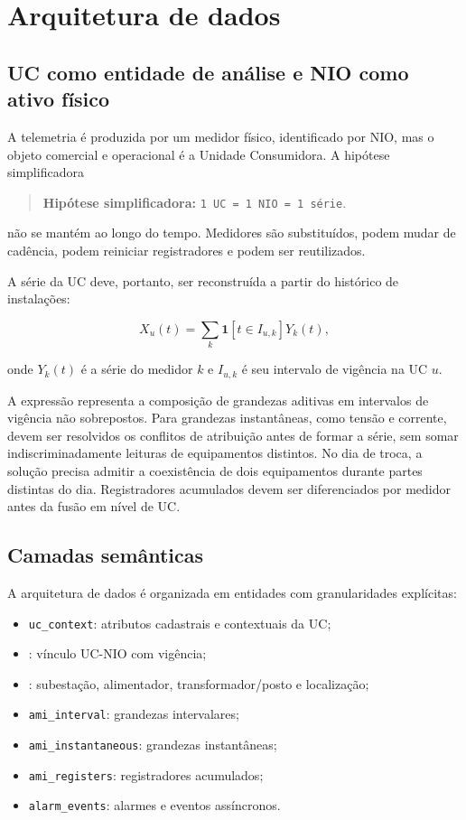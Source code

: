 \chapter{Arquitetura de dados}\label{arquitetura-de-dados}

\section{UC como entidade de análise e NIO como ativo físico}\label{uc-como-entidade-de-anuxe1lise-e-nio-como-ativo-fuxedsico}

A telemetria é produzida por um medidor físico, identificado por NIO, mas o objeto comercial e operacional é a Unidade Consumidora. A hipótese simplificadora

\begin{quote}
\textbf{Hipótese simplificadora:} \texttt{1~UC~=~1~NIO~=~1~série}.
\end{quote}

não se mantém ao longo do tempo. Medidores são substituídos, podem mudar de cadência, podem reiniciar registradores e podem ser reutilizados.

A série da UC deve, portanto, ser reconstruída a partir do histórico de instalações:

\[X_u(t)=\sum_k \mathbf{1}[t\in I_{u,k}]Y_k(t),\]

onde \(Y_k(t)\) é a série do medidor \(k\) e \(I_{u,k}\) é seu intervalo de vigência na UC \(u\).

A expressão representa a composição de grandezas aditivas em intervalos de vigência não sobrepostos. Para grandezas instantâneas, como tensão e corrente, devem ser resolvidos os conflitos de atribuição antes de formar a série, sem somar indiscriminadamente leituras de equipamentos distintos. No dia de troca, a solução precisa admitir a coexistência de dois equipamentos durante partes distintas do dia. Registradores acumulados devem ser diferenciados por medidor antes da fusão em nível de UC.

\section{Camadas semânticas}\label{camadas-semuxe2nticas}

A arquitetura de dados é organizada em entidades com granularidades explícitas:

\begin{itemize}
\item
  \texttt{uc\_context}: atributos cadastrais e contextuais da UC;
\item
  : vínculo UC-NIO com vigência;
\item
  : subestação, alimentador, transformador/posto e localização;
\item
  \texttt{ami\_interval}: grandezas intervalares;
\item
  \texttt{ami\_instantaneous}: grandezas instantâneas;
\item
  \texttt{ami\_registers}: registradores acumulados;
\item
  \texttt{alarm\_events}: alarmes e eventos assíncronos.
\end{itemize}

